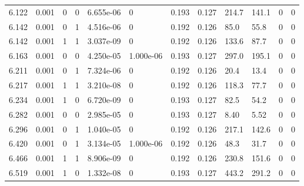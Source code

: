 \documentclass[preview]{standalone}
\begin{document}
{{{{\begin{tabular}{L{1.2cm}C{1.2cm} C{0.3cm}C{0.5cm} C{1.4cm}C{1.4cm} C{1.4cm}C{1.4cm} C{1.6cm}C{1.6cm} C{1.6cm}C{1.6cm}}
  6.122  &  0.001  & 0     &  0 &  6.655e-06  & 0  &  0.193&   0.127& 214.7 & 141.1   &  0 & 0  \\ 
  6.142  &  0.001  & 0     &  1 &  4.516e-06  & 0  &  0.192&   0.126& 85.0 & 55.8   &  0 & 0  \\ 
  6.142  &  0.001  & 1     &  1 &  3.037e-09  & 0  &  0.192&   0.126& 133.6 & 87.7   &  0 & 0  \\ 
  6.163  &  0.001  & 0     &  0 &  4.250e-05  & 1.000e-06  &  0.193&   0.127& 297.0 & 195.1   &  0 & 0  \\ 
  6.211  &  0.001  & 0     &  1 &  7.324e-06  & 0  &  0.192&   0.126& 20.4 & 13.4   &  0 & 0  \\ 
  6.217  &  0.001  & 1     &  1 &  3.210e-08  & 0  &  0.192&   0.126& 118.3 & 77.7   &  0 & 0  \\ 
  6.234  &  0.001  & 1     &  0 &  6.720e-09  & 0  &  0.193&   0.127& 82.5 & 54.2   &  0 & 0  \\ 
  6.282  &  0.001  & 0     &  0 &  2.985e-05  & 0  &  0.193&   0.127& 8.40 & 5.52   &  0 & 0  \\ 
  6.296  &  0.001  & 0     &  1 &  1.040e-05  & 0  &  0.192&   0.126& 217.1 & 142.6   &  0 & 0  \\ 
  6.420  &  0.001  & 0     &  1 &  3.134e-05  & 1.000e-06  &  0.192&   0.126& 48.3 & 31.7   &  0 & 0  \\ 
  6.466  &  0.001  & 1     &  1 &  8.906e-09  & 0  &  0.192&   0.126& 230.8 & 151.6   &  0 & 0  \\ 
  6.519  &  0.001  & 1     &  0 &  1.332e-08  & 0  &  0.193&   0.127& 443.2 & 291.2   &  0 & 0  \\ 
\hline 
\end{tabular} 

}}}}
\end{document}
